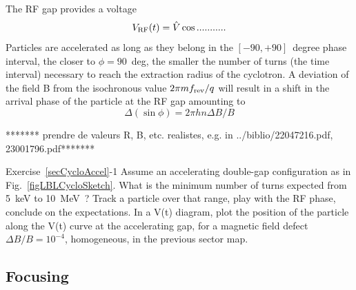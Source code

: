 The RF gap provides a voltage  
\begin{equation}
\label{EqRCyclo}
V_{\rm RF}(t) =\hat V \cos ........... 
\end{equation}
Particles are accelerated as long as they belong in the $[-90,+90]$~degree phase interval, 
the closer to $\phi=90$~deg, the smaller the number of turns 
(the time interval) necessary to reach the extraction radius of the cyclotron.
A deviation of the field B from the isochronous value $2\pi m f_{\rm rev}/q$
will result in a  shift in the arrival phase of the particle at the RF gap amounting to 
\begin{equation}
\label{EqPFPhaseCyclo}
\Delta (\sin \phi) = 2\pi h n \Delta B/B
\end{equation}

 ******* prendre de valeurs R, B, etc. realistes, e.g. in ../biblio/22047216.pdf, 23001796.pdf*******

\smallskip
\noindent {\small $\bullet$} Exercise~\ref{secCycloAccel}-1 
Assume an accelerating double-gap  configuration as in Fig.~\ref{figLBLCycloSketch}. 
What is the minimum number of turns  expected  from 5~keV to 10~MeV~? Track a particle over that range, 
play with the RF phase, conclude on the  expectations. 
In a V(t) diagram, plot  the position  of the particle along the V(t) curve at the 
accelerating gap, for a magnetic field defect 
$\Delta B/B= 10^{-4}$, homogeneous, in the previous sector  map. 




\subsection{Focusing  \label{secCycloFocus}}

